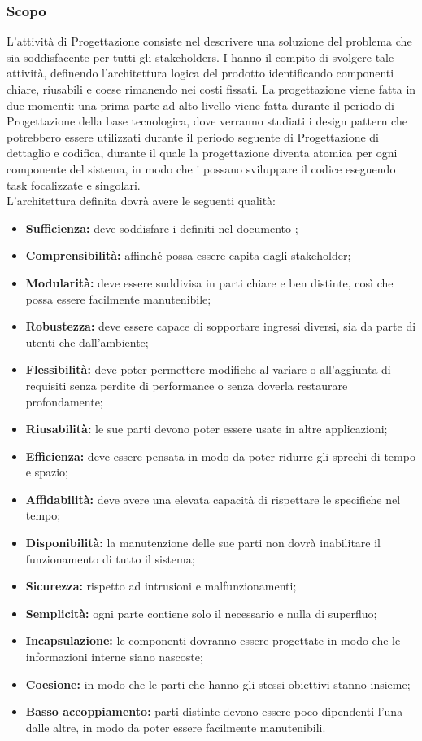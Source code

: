 \documentclass[NormeDiProgetto.tex]{subfiles}
\begin{document}
\subsubsection{Scopo}
L'attività di Progettazione consiste nel descrivere una soluzione del problema
che sia soddisfacente per tutti gli stakeholders.
I \progi hanno il compito di svolgere tale attività, definendo l'architettura logica del prodotto identificando componenti chiare, riusabili e coese rimanendo nei costi fissati. La progettazione viene fatta in due momenti: una prima parte ad alto livello viene fatta durante il periodo di Progettazione della base tecnologica, dove verranno studiati i design pattern che potrebbero essere utilizzati durante il periodo seguente di Progettazione di dettaglio e codifica, durante il quale la progettazione diventa atomica per ogni componente del sistema, in modo che i \progri possano sviluppare il codice eseguendo task focalizzate e singolari.\\
L'architettura definita dovrà avere le seguenti qualità:
\begin{itemize}
	\item \textbf{Sufficienza:} deve soddisfare i  definiti nel documento \adr;
	\item \textbf{Comprensibilità:} affinché possa essere capita dagli stakeholder;
	\item \textbf{Modularità:} deve essere suddivisa in parti chiare e ben distinte, così che possa essere facilmente manutenibile;
	\item \textbf{Robustezza:} deve essere capace di sopportare ingressi diversi, sia da parte di utenti che dall'ambiente;
	\item \textbf{Flessibilità:} deve poter permettere modifiche al variare o all'aggiunta di requisiti senza perdite di performance o senza doverla restaurare profondamente;
	\item \textbf{Riusabilità:} le sue parti devono poter essere usate in altre applicazioni;
	\item \textbf{Efficienza:} deve essere pensata in modo da poter ridurre gli sprechi di tempo e spazio;
	\item \textbf{Affidabilità:} deve avere una elevata capacità di rispettare le specifiche nel tempo;
	\item \textbf{Disponibilità:} la manutenzione delle sue parti non dovrà inabilitare il funzionamento di tutto il sistema;
	\item \textbf{Sicurezza:} rispetto ad intrusioni e malfunzionamenti;
	\item \textbf{Semplicità:} ogni parte contiene solo il necessario e nulla di superfluo;
	\item \textbf{Incapsulazione:} le componenti dovranno essere progettate in modo che le informazioni interne siano nascoste;
	\item \textbf{Coesione:} in modo che le parti che hanno gli stessi obiettivi stanno insieme;
	\item \textbf{Basso accoppiamento:} parti distinte devono essere poco dipendenti l'una dalle altre, in modo da poter essere facilmente manutenibili.
\end{itemize}
\end{document}
